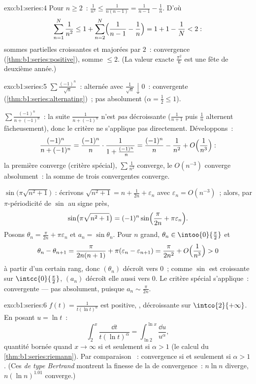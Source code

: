 \begin{solution}{exo:b1:series:4}
Pour $n \geq 2$~: $\frac{1}{n^2} \leq \frac{1}{n(n-1)} =
\frac{1}{n-1} - \frac1n$. D'où
\[
\sum_{n=1}^{N} \frac{1}{n^2} \leq 1 + \sum_{n=2}^{N}
\Bigl(\frac{1}{n-1} - \frac1n\Bigr) = 1 + 1 - \frac1N < 2 :
\]
sommes partielles croissantes et majorées par $2$~: convergence
(\cref{thm:b1:series:positive}), somme $\leq 2$. (La valeur exacte
$\frac{\pi^2}{6}$ est une fête de deuxième année.)
\end{solution}

\begin{solution}{exo:b1:series:5}
$\sum \frac{(-1)^n}{\sqrt n}$~: alternée avec $\frac{1}{\sqrt n}
\downarrow 0$~: convergente (\cref{thm:b1:series:alternating})~; pas
absolument ($\alpha = \frac12 \leq 1$).

$\sum \frac{(-1)^n}{n + (-1)^n}$~: la suite $\frac{1}{n +
(-1)^n}$ n'est \emph{pas} décroissante ($\frac{1}{n+1}$ puis
$\frac{1}{n}$ alternent fâcheusement), donc le critère ne s'applique
pas directement. Développons~:
\[
\frac{(-1)^n}{n + (-1)^n}
= \frac{(-1)^n}{n}\cdot\frac{1}{1 + \frac{(-1)^n}{n}}
= \frac{(-1)^n}{n} - \frac{1}{n^2} +
O\Bigl(\frac{1}{n^3}\Bigr):
\]
la première  converge (critère spécial), $\sum \frac{1}{n^2}$
converge, le $O(n^{-3})$ converge absolument~: la somme de trois
 convergentes converge.

$\sin\bigl(\pi\sqrt{n^2+1}\bigr)$~: écrivons $\sqrt{n^2 + 1} = n +
\frac{1}{2n} + \varepsilon_n$ avec $\varepsilon_n = O(n^{-3})$~;
alors, par $\pi$-périodicité de $\sin$ au signe près,
\[
\sin\bigl(\pi\sqrt{n^2+1}\bigr)
= (-1)^n \sin\Bigl(\frac{\pi}{2n} + \pi\varepsilon_n\Bigr) .
\]
Posons $\theta_n = \frac{\pi}{2n} + \pi\varepsilon_n$ et $a_n =
\sin\theta_n$. Pour $n$ grand, $\theta_n \in \intoo{0}{\frac\pi2}$
et
\[
\theta_n - \theta_{n+1} = \frac{\pi}{2n(n+1)} +
\pi(\varepsilon_n - \varepsilon_{n+1})
= \frac{\pi}{2n^2} + O\Bigl(\frac{1}{n^3}\Bigr) > 0
\]
à partir d'un certain rang, donc $(\theta_n)$ décroît vers $0$~;
comme $\sin$ est croissante sur $\intcc{0}{\frac\pi2}$, $(a_n)$
décroît elle aussi vers $0$. Le critère spécial s'applique~:
convergente --- pas absolument, puisque $a_n \sim \frac{\pi}{2n}$.
\end{solution}

\begin{solution}{exo:b1:series:6}
$f(t) = \frac{1}{t(\ln t)^\alpha}$ est positive, ,
décroissante sur $\intco{2}{+\infty}$. En posant $u = \ln t$~:
\[
\int_2^x \frac{\dd t}{t(\ln t)^\alpha}
= \int_{\ln 2}^{\ln x} \frac{\dd u}{u^\alpha},
\]
quantité bornée quand $x \to \infty$ si et seulement si $\alpha > 1$
(le calcul du \cref{thm:b1:series:riemann}). Par comparaison
~: convergence si et seulement si $\alpha > 1$. (Ces
 \emph{de type Bertrand} montrent la finesse de la  de
convergence~: $n\ln n$ diverge, $n(\ln n)^{1.01}$ converge.)
\end{solution}

